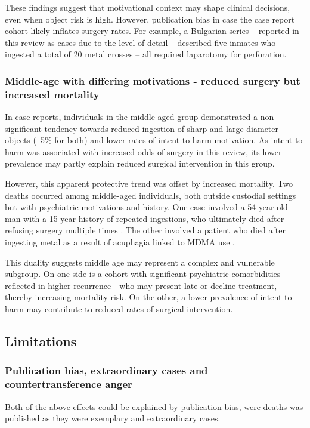 These findings suggest that motivational context may shape clinical decisions, even when object risk is high. However, publication bias in case the case report cohort likely inflates surgery rates. For example, a Bulgarian series \cite{Losanoff_1996, Losanoff_1997e} -- reported in this review as cases due to the level of detail -- described five inmates who ingested a total of 20 metal crosses -- all required laparotomy for perforation.

\subsubsection{Middle-age with differing motivations - reduced surgery but increased mortality}
In case reports, individuals in the middle-aged group demonstrated a non-significant tendency towards reduced ingestion of sharp and large-diameter objects (–5\% for both) and lower rates of intent-to-harm motivation. As intent-to-harm was associated with increased odds of surgery in this review, its lower prevalence may partly explain reduced surgical intervention in this group.

However, this apparent protective trend was offset by increased mortality. Two deaths occurred among middle-aged individuals, both outside custodial settings but with psychiatric motivations and history. One case involved a 54-year-old man with a 15-year history of repeated ingestions, who ultimately died after refusing surgery multiple times \cite{Kumar_2001}. The other involved a patient who died after ingesting metal as a result of acuphagia linked to MDMA use \cite{Emamhadi_2018}.

This duality suggests middle age may represent a complex and vulnerable subgroup. On one side is a cohort with significant psychiatric comorbidities—reflected in higher recurrence—who may present late or decline treatment, thereby increasing mortality risk. On the other, a lower prevalence of intent-to-harm may contribute to reduced rates of surgical intervention.

\subsection{Limitations}

\subsubsection{Publication bias, extraordinary cases and countertransference anger}
Both of the above effects could be explained by publication bias, were deaths was published as they were exemplary and extraordinary cases. 

